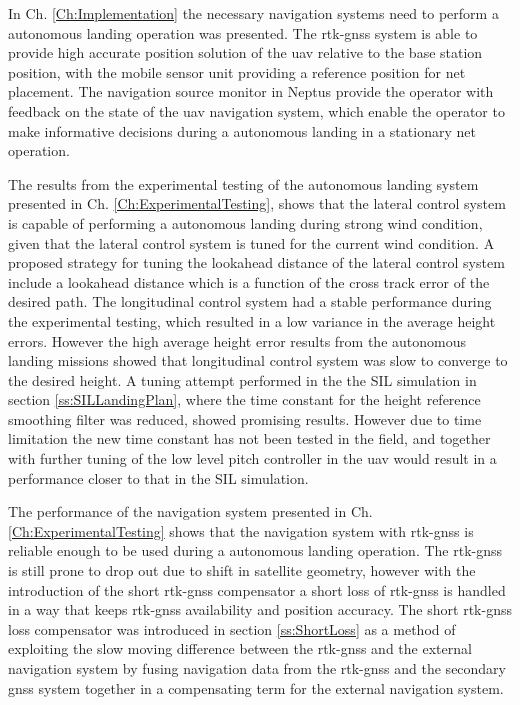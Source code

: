 In Ch. \ref{Ch:Implementation} the necessary navigation systems need to perform a autonomous landing operation was presented. The \gls{rtk-gnss} system is able to provide high accurate position solution of the \gls{uav} relative to the base station position, with the mobile sensor unit providing a reference position for net placement. The navigation source monitor in Neptus provide the operator with feedback on the state of the \gls{uav} navigation system, which enable the operator to make informative decisions during a autonomous landing in a stationary net operation.


The results from the experimental testing of the autonomous landing system presented in Ch. \ref{Ch:ExperimentalTesting}, shows that the lateral control system is capable of performing a autonomous landing during strong wind condition, given that the lateral control system is tuned for the current wind condition. A proposed strategy for tuning the lookahead distance of the lateral control system include a lookahead distance which is a function of the cross track error of the desired path. The longitudinal control system had a stable performance during the experimental testing, which resulted in a low variance in the average height errors. However the high average height error results from the autonomous landing missions showed that longitudinal control system was slow to converge to the desired height. A tuning attempt performed in the the SIL simulation in section \ref{ss:SILLandingPlan}, where the time constant for the height reference smoothing filter was reduced, showed promising results. However due to time limitation the new time constant has not been tested in the field, and together with further tuning of the low level pitch controller in the \gls{uav} would result in a performance closer to that in the SIL simulation.


The performance of the navigation system presented in Ch. \ref{Ch:ExperimentalTesting} shows that the navigation system with \gls{rtk-gnss} is reliable enough to be used during a autonomous landing operation. The \gls{rtk-gnss} is still prone to drop out due to shift in satellite geometry, however with the introduction of the short \gls{rtk-gnss} compensator a short loss of \gls{rtk-gnss} is handled in a way that keeps \gls{rtk-gnss} availability and position accuracy. The short \gls{rtk-gnss} loss compensator was introduced in section \ref{ss:ShortLoss} as a method of exploiting the slow moving difference between the \gls{rtk-gnss} and the external navigation system by fusing navigation data from the \gls{rtk-gnss} and the secondary \gls{gnss} system together in a compensating term for the external navigation system.


